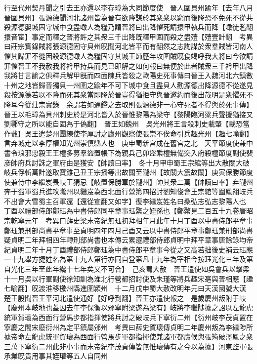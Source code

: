 行至代州契丹聞之引去王亦還以李存璋為大同節度使　晉人圍貝州踰年【去年八月晉圍貝州】張源德聞河北諸州皆為晉有欲降謀於其衆衆以窮而後降恐不免死不從共殺源德嬰城固守城中食盡噉人為糧乃謂晉將曰出降懼死請擐甲執兵而降【噉徒濫翻擐音宦】事定而釋之晉將許之其衆三千出降旣釋甲圍而殺之盡殪【殪壹計翻　考異曰莊宗實錄賊將張源德固守貝州旣聞河北皆平而有翻然之志詢謀於衆羣賊皆河南人懼其歸罪不從因殺源德噉人為糧固守其城王師歷年攻圍賊旣食竭呼我大將曰今欲請罪懼晉王不我赦我將衿甲持兵而見已即解之如何報曰無便於此者賊衆三千衿甲出降我將甘言諭之俱釋兵解甲旣而四面陳兵皆殺之歐陽史死事傳曰晉王入魏河北六鎮數十州之地皆歸晉獨貝一州圍之踰年不可下城中食且盡貝人勸源德出降源德不從遂見殺按源德若以不降而死其衆當即降於晉豈得猶拒守與晉邀約而後出哉明是衆懼死不降耳今從莊宗實錄　余謂若如通鑑之去取則張源德非一心守死者不得與於死事傳】晉王以毛璋為貝州刺史於是河北皆入於晉惟黎陽為梁守【黎陽臨河梁兵聲援猶接又劉鄩守之所以能自固為于偽翻】　晉王如魏州　吳光州將王言殺刺史載肇【載恐當作戴】吳王遣楚州團練使李厚討之廬州觀察使張崇不俟命引兵趣光州【趣七喻翻】言弃城走以李厚權知光州崇慎縣人也　庚申蜀新宫成在舊宫之北　天平節度使兼中書令琅邪忠毅王王檀多募羣盜置帳下為親兵己卯盜乘檀無備突入府殺檀節度副使裴彦帥府兵討誅之軍府由是獲安【帥讀曰率】　冬十月甲申蜀王宗綰等出大散關大破岐兵俘斬萬計遂取寶雞己丑王宗播等出故關至隴州【故關大震故關】庚寅保勝節度使兼侍中李繼岌畏岐王猜忌【岐置保勝軍於隴州】帥其衆二萬【帥讀曰率】弃隴州奔于蜀軍蜀兵進攻隴州以繼岌為西北面行營第四招討劉知俊會王宗綰等圍鳳翔岐兵不出會大雪蜀主召軍還【還從宣翻又如字】復李繼岌姓名曰桑弘志弘志黎陽人也　丁酉以禮部侍郎鄭珏為中書侍郎同平章事珏綮之姪孫也【鄭綮見二百五十九卷唐昭宗乾寧元年　考異曰薛史梁末帝紀無珏初拜相年月此年十月丁酉以中書侍郎平章事鄭珏兼刑部尚書平章事至貞明四年四月己酉又云以中書侍郎平章事鄭珏兼刑部尚書疑貞明二年拜相四年轉刑部尚書也本傳云累遷禮部侍郎貞明中拜平章事唐餘錄均帝紀貞明二年十月丁酉禮部侍郎鄭珏為中書侍郎平章事今從之又高若拙後史補云珏應一十九舉方捷姓名為第十九人第行亦同自登第凡十九年為宰相今按珏光化三年及第自光化三年至此年纔十七年矣又不可合】　己亥蜀大赦　晉王遣使如吳會兵以擊梁十一月吳以行軍副使徐知訓為淮北行營都招討使及朱瑾等將兵趣宋亳與晉相應【趣七喻翻】旣渡淮移檄州縣進圍潁州　十二月戊申蜀大赦改明年元曰天漢國號大漢　楚王殷聞晉王平河北遣使通好【好呼到翻】晉王亦遣使報之　是歲慶州叛附于岐【慶州本岐地也蓋因去年李保衡以邠寧附梁遂為梁有】岐將李繼陟據之詔以左龍虎統軍賀瓌為西面行營馬步都指揮使將兵討之破岐兵下寧衍二州【衍州岐李茂貞置在寧慶之間宋廢衍州為定平鎮屬邠州　考異曰薛史賀瓌傳貞明二年慶州叛為李繼陟所據帝命左龍虎統軍賀瓌為西面行營馬步軍都指揮使兼諸軍都虞候與張筠破涇鳳之衆三萬下寧衍二州此非小事而末帝紀李茂貞傳皆無惟瓌傳有之今以為據】河東監軍張承業旣貴用事其姪瓘等五人自同州

